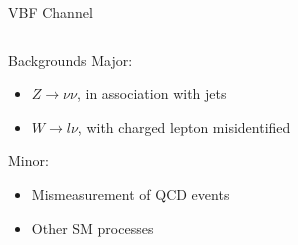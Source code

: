 \documentclass[8pt]{beamer}
\begin{document}
\begin{frame}{VBF Channel}
\begin{columns}
\begin{block}{Backgrounds}
Major:
\begin{itemize}
 \item $Z \rightarrow \nu \nu$, in association with jets
 \item $W \rightarrow l \nu$, with charged lepton misidentified
\end{itemize}

Minor:
\begin{itemize}
 \item Mismeasurement of QCD events
 \item Other SM processes
\end{itemize}

\end{block}

\end{columns}

\end{frame}
\end{document}
